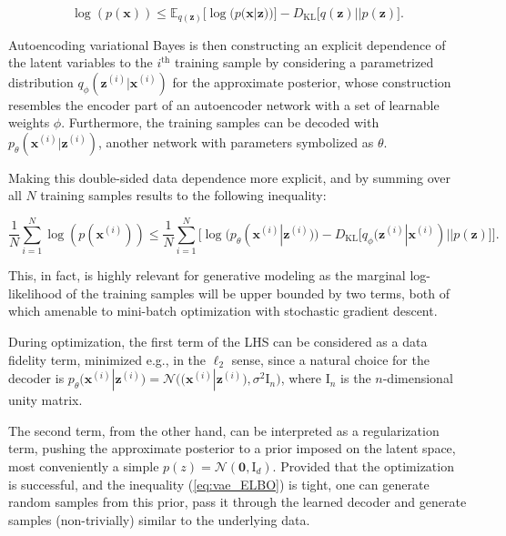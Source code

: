 \documentclass{article}
\begin{document}
\begin{equation}  \label{eq:VB_ELBO}
\log(p(\mathbf{x})) \leqslant \mathbb{E}_{q(\mathbf{z})} \Big[ \log(p(\mathbf{x}|\mathbf{z}))  \Big] - D_{\text{KL}}\Big[ q(\mathbf{z}) || p(\mathbf{z}) \Big].
\end{equation}


Autoencoding variational Bayes \cite{VAE} is then constructing an explicit dependence of the latent variables to the $i^{\text{th}}$ training sample by considering a parametrized distribution $q_{\phi}(\mathbf{z}^{(i)}|\mathbf{x}^{(i)})$ for the approximate posterior, whose construction resembles the encoder part of an autoencoder network with a set of learnable weights $\phi$. Furthermore, the training samples can be decoded with $p_{\theta}(\mathbf{x}^{(i)} | \mathbf{z}^{(i)})$, another network with parameters symbolized as $\theta$.

Making this double-sided data dependence more explicit, and by summing over all $N$ training samples results to the following inequality:


\begin{equation} \label{eq:vae_ELBO}
\frac{1}{N}\sum_{i=1}^N \log(p(\mathbf{x}^{(i)})) \leqslant \frac{1}{N} \sum_{i=1}^N \Big[ \log(p_{\theta}(\mathbf{x}^{(i)}|\mathbf{z}^{(i)}))   -  D_{\text{KL}}\big[ q_{\phi}(\mathbf{z}^{(i)}  | \mathbf{x}^{(i)}) || p(\mathbf{z}) \big] \Big].
\end{equation}

This, in fact, is highly relevant for generative modeling as the marginal log-likelihood of the training samples will be upper bounded by two terms, both of which amenable to mini-batch optimization with stochastic gradient descent. 

During optimization, the first term of the LHS can be considered as a data fidelity term, minimized e.g., in the $\ell_2$ sense, since a natural choice for the decoder is $p_{\theta}(\mathbf{x}^{(i)}|\mathbf{z}^{(i)}) = \mathcal{N} \Big( \big( \mathbf{x}^{(i)}|\mathbf{z}^{(i)} \big) , \sigma^2 \mathrm{I}_n \Big)$, where $\mathrm{I}_n$ is the $n$-dimensional unity matrix.

The second term, from the other hand, can be interpreted as a regularization term, pushing the approximate posterior to a prior imposed on the latent space, most conveniently a simple $p(z) = \mathcal{N}(\mathbf{0}, \mathrm{I}_d)$. Provided that the optimization is successful, and the inequality (\ref{eq:vae_ELBO}) is tight, one can generate random samples from this prior, pass it through the learned decoder and generate samples (non-trivially) similar to the underlying data.   
\end{document}
